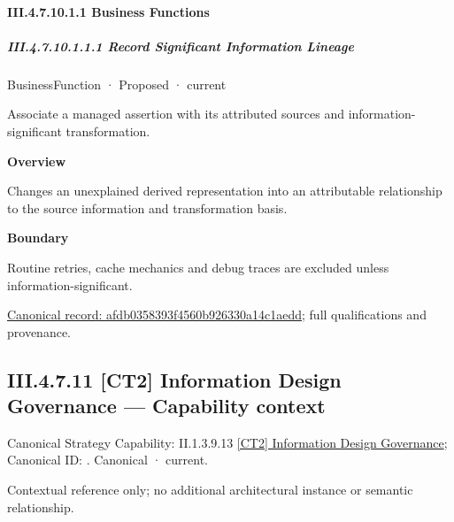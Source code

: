 \paragraph*{III.4.7.10.1.1 Business Functions}
\label{navigation:III.4.7.10.1.1}

\subparagraph*{III.4.7.10.1.1.1 Record Significant Information Lineage}
\label{navigation:III.4.7.10.1.1.1}

\label{element:afdb0358393f4560b926330a14c1aedd}
{\small BusinessFunction · Proposed · current}\par

Associate a managed assertion with its attributed sources and information-significant transformation.



\textbf{Overview}



Changes an unexplained derived representation into an attributable relationship to the source information and transformation basis.



\textbf{Boundary}



Routine retries, cache mechanics and debug traces are excluded unless information-significant.


{\footnotesize \href{../../../../../../../continuum/business/business-function/afdb0358393f4560b926330a14c1aedd.md}{Canonical record: afdb0358393f4560b926330a14c1aedd}; full qualifications and provenance.}\par
\subsection*{III.4.7.11 [CT2] Information Design Governance — Capability context}
\label{navigation:III.4.7.11}

{\small Canonical Strategy Capability: II.1.3.9.13 \hyperref[element:f39ed9ebcc724857a4bf7a2b8e045c7a]{[CT2] Information Design Governance}; Canonical ID: \texttt{}. Canonical · current.}\par
Contextual reference only; no additional architectural instance or semantic relationship.\par
